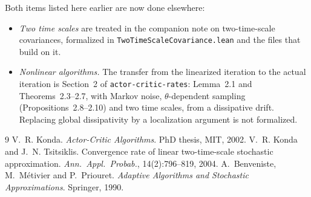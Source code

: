 \documentclass[11pt]{article}
\theoremstyle{definition}
\theoremstyle{remark}
\begin{document}
Both items listed here earlier are now done elsewhere:
\begin{itemize}
\item \emph{Two time scales} are treated in the companion note on two-time-scale covariances,
  formalized in \texttt{TwoTimeScaleCovariance.lean} and the files that build on it.
\item \emph{Nonlinear algorithms.} The transfer from the linearized iteration to the actual
  iteration is Section~2 of \texttt{actor-critic-rates}: Lemma~2.1 and Theorems~2.3--2.7, with Markov
  noise, $\theta$-dependent sampling (Propositions~2.8--2.10) and two time scales, from a dissipative
  drift. Replacing global dissipativity by a localization argument is not formalized.
\end{itemize}

\begin{thebibliography}{9}
 V.~R. Konda. \emph{Actor-Critic Algorithms}. PhD thesis, MIT, 2002.
 V.~R. Konda and J.~N. Tsitsiklis. Convergence rate of linear
  two-time-scale stochastic approximation. \emph{Ann.\ Appl.\ Probab.}, 14(2):796--819, 2004.
 A.~Benveniste, M.~M\'etivier and P.~Priouret. \emph{Adaptive Algorithms
  and Stochastic Approximations}. Springer, 1990.
\end{thebibliography}
\end{document}
